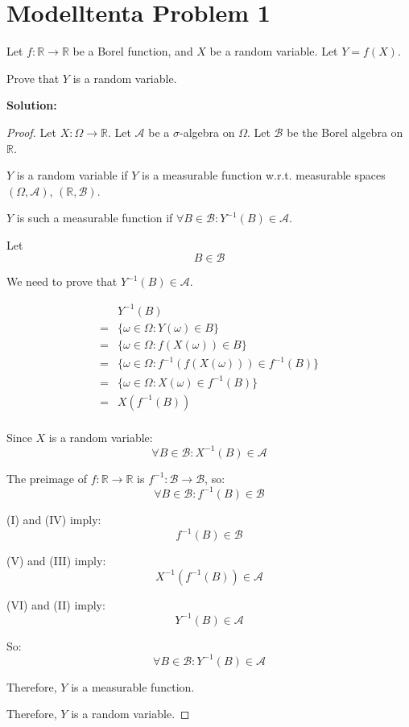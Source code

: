 \documentclass{article}
\begin{document}
\section{Modelltenta Problem 1}

Let \(f : \mathbb{R} \to \mathbb{R}\) be a Borel function, and \(X\) be a
random variable. Let \(Y = f(X)\).

Prove that \(Y\) is a random variable.

\textbf{Solution:}

\begin{proof}
Let \(X:\Omega\to \mathbb{R}\).
Let \(\mathcal{A}\) be a \(\sigma\)-algebra on \(\Omega\).
Let \(\mathcal{B}\) be the Borel algebra on \(\mathbb{R}\).

\(Y\) is a random variable if \(Y\) is a measurable function w.r.t. measurable
spaces \((\Omega, \mathcal{A})\), \((\mathbb{R}, \mathcal{B})\).

\(Y\) is such a measurable function if \(\forall B\in \mathcal{B}: Y^{-1}(B)\in \mathcal{A}\).

Let
\[B\in \mathcal{B}\tag{I}\]

We need to prove that \(Y^{-1}(B)\in \mathcal{A}\).

\begin{align*}
	 & Y^{-1}(B) \\
	=& \{\omega\in \Omega: Y(\omega)\in B\} \\
	=& \{\omega\in \Omega: f(X(\omega))\in B\} \\
	=& \{\omega\in \Omega: f^{-1}(f(X(\omega)))\in f^{-1}(B)\} \\
	=& \{\omega\in \Omega: X(\omega)\in f^{-1}(B)\} \\
	=& X(f^{-1}(B)) \tag{II} \\
\end{align*}

Since \(X\) is a random variable:
\[\forall B\in \mathcal{B}: X^{-1}(B)\in \mathcal{A} \tag{III}\]

The preimage of \(f:\mathbb{R}\to\mathbb{R}\) is \(f^{-1}: \mathcal{B} \to\mathcal{B}\), so:
\[\forall B \in \mathcal{B}: f^{-1}(B)\in \mathcal{B} \tag{IV}\]

(I) and (IV) imply:
\[f^{-1}(B) \in \mathcal{B} \tag{V}\]

(V) and (III) imply:
\[X^{-1}(f^{-1}(B))\in \mathcal{A}\tag{VI}\]

(VI) and (II) imply:
\[Y^{-1}(B) \in \mathcal{A}\]

So:
\[\forall B\in \mathcal{B}:Y^{-1}(B) \in \mathcal{A}\]

Therefore, \(Y\) is a measurable function.

Therefore, \(Y\) is a random variable.
\end{proof}
\end{document}
